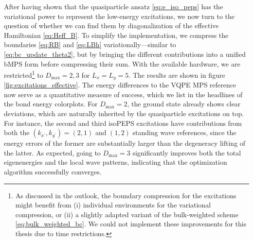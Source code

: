 \noindent After having shown that the quasiparticle ansatz \eqref{eq:e_iso_peps} has the variational power to represent the low-energy excitations, we now turn to the question of whether we can find them by diagonalization of the effective Hamiltonian \eqref{eq:Heff_B}. To simplify the implementation, we compress the boundaries \eqref{eq:RB} and \eqref{eq:LBh} variationally---similar to \eqref{eq:bc_update_theta2}, but by bringing the different contributions into a unified bMPS form before compressing their sum. With the available hardware, we are restricted\footnote{As discussed in the outlook, the boundary compression for the excitations might benefit from (i) individual environments for the variational compression, or (ii) a slightly adapted variant of the bulk-weighted scheme \eqref{eq:bulk_weighted_bc}. We could not implement these improvements for this thesis due to time restrictions.} to $D_{\text{max}} = 2, 3$ for $L_x = L_y = 5$. The results are shown in figure \ref{fig:excitations_effective}. The energy differences to the VQPE MPS reference now serve as a quantitative measure of success, which we list in the headlines of the bond energy colorplots. For $D_{\text{max}} = 2$, the ground state already shows clear deviations, which are naturally inherited by the quasiparticle excitations on top. For instance, the second and third isoPEPS excitations have contributions from both the $(k_{x^{\prime}}, k_{y^{\prime}}) = (2, 1)$ and $(1, 2)$ standing wave references, since the energy errors of the former are substantially larger than the degeneracy lifting of the latter. As expected, going to $D_{\text{max}} = 3$ significantly improves both the total eigenenergies and the local wave patterns, indicating that the optimization algorithm successfully converges.

